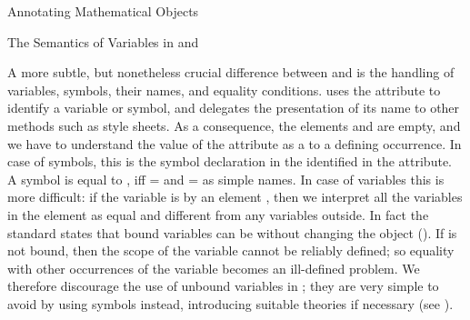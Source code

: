 \begin{omgroup}[id=annotating]{Annotating Mathematical Objects}
\begin{module}[id=omml-semvar]
\begin{omgroup}[id=sem-var,short=Semantics of Variables]{The Semantics of Variables in
  \openmath and \cmathml}
\begin{omtext}
A more subtle, but nonetheless crucial difference between {\openmath} and {\mathml} is the
handling of variables, symbols, their names, and equality conditions.  {\openmath} uses
the  attribute to identify a variable or symbol,
and delegates the presentation of its name to other methods such as style sheets. As a
consequence, the elements  and  are
empty, and we have to understand the value of the {} attribute as a {} to a defining occurrence. In case of
symbols, this is the symbol declaration in the  identified
in the  attribute. A symbol {} is equal to {}, iff
{=} and {=} as {\xml}
simple names.  In case of variables this is more difficult: if the variable is
 by an  element
{}, then we
interpret all the variables {} in the
 element as equal and different from any variables
{} outside. In fact the {\openmath} standard states that bound
variables can be  without changing the object
({}). If {} is
not bound, then the scope of the variable cannot be reliably defined; so equality with
other occurrences of the variable {} becomes an ill-defined
problem.  We therefore discourage the use of unbound variables in \omdoc; they are very
simple to avoid by using symbols instead, introducing suitable theories if necessary (see
).


\end{omtext}
\end{omgroup}
\end{module}
\end{omgroup}
